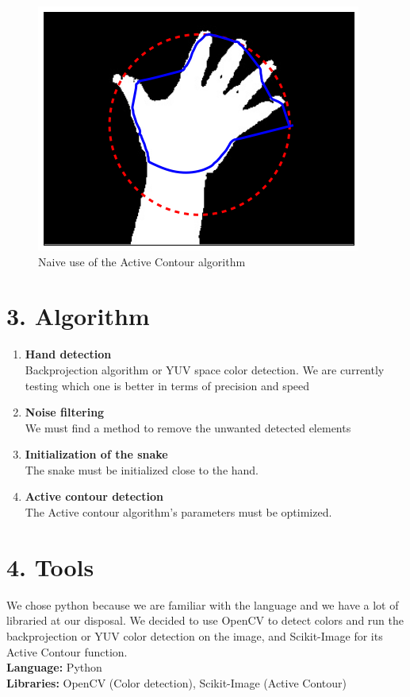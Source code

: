 \documentclass{report}
\begin{document}
\begin{figure}[H]
\centering
              \includegraphics[scale=0.2]{res1}
              \caption{Naive use of the Active Contour algorithm}
          \end{figure}

\section*{3. Algorithm}

\begin{enumerate}

\item \textbf{Hand detection}\\
Backprojection algorithm or YUV space color detection. 
We are currently testing which one is better in terms of precision and speed

\item \textbf{Noise filtering}\\
We must find a method to remove the unwanted detected elements

\item \textbf{Initialization of the snake} \\
The snake must be initialized close to the hand.

\item \textbf{Active contour detection} \\
The Active contour algorithm's parameters must be optimized. 

\end{enumerate}

\section*{4. Tools}

We chose python because we are familiar with the language and we have a lot of libraried at our disposal. We decided to use OpenCV to detect colors and run the backprojection or YUV color detection on the image, and Scikit-Image for its Active Contour function.\\

\textbf{Language:} Python\\

\textbf{Libraries:} OpenCV (Color detection), Scikit-Image (Active Contour)\\
\end{document}

